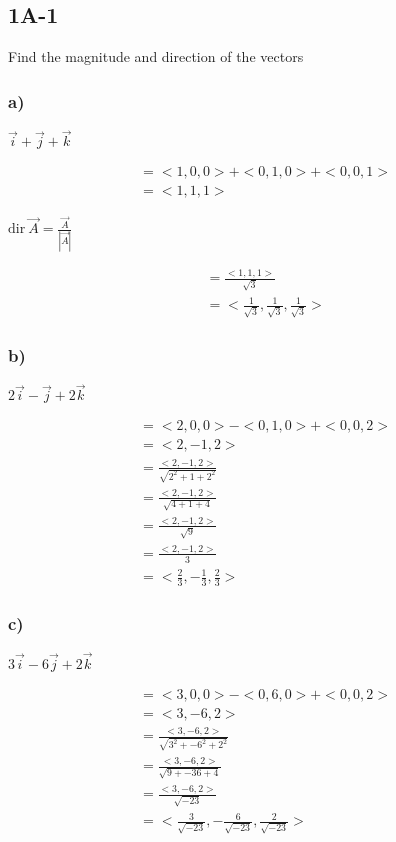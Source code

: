 \subsection*{1A-1}
Find the magnitude and direction of the vectors
    
\subsubsection*{a)} $\vec{i} + \vec{j} + \vec{k}$

        \begin{align*}
            &= <1, 0, 0> + <0,1,0> + <0,0,1>\\
            &= <1,1,1>
        \end{align*}

        $\text{dir} \ \vec{A} = \frac{\vec{A}}{|\vec{A}|}$

        \begin{align*}
            &= \frac{<1,1,1>}{\sqrt{3}}\\
            &= <\frac{1}{\sqrt{3}}, \frac{1}{\sqrt{3}},\frac{1}{\sqrt{3}}>
        \end{align*}

\subsubsection*{b)} $2\vec{i} - \vec{j} + 2\vec{k}$

    \begin{align*}
        &= <2, 0, 0> - <0,1,0> + <0,0,2>\\
        &= <2,-1,2>\\
        &= \frac{<2,-1,2>}{\sqrt{2^2 + 1 + 2^2}}\\
        &= \frac{<2,-1,2>}{\sqrt{4 + 1 + 4}}\\
        &= \frac{<2,-1,2>}{\sqrt{9}}\\
        &= \frac{<2,-1,2>}{3}\\
        &= <\frac{2}{3}, -\frac{1}{3},\frac{2}{3}>
    \end{align*}


\subsubsection*{c)}$3\vec{i} - 6\vec{j} + 2\vec{k}$

    \begin{align*}
        &= <3, 0, 0> - <0,6,0> + <0,0,2>\\
        &= <3,-6,2>\\
        &= \frac{<3,-6,2>}{\sqrt{3^2 + -6^2 + 2^2}}\\
        &= \frac{<3,-6,2>}{\sqrt{9 + -36 + 4}}\\
        &= \frac{<3,-6,2>}{\sqrt{-23}}\\
        &= <\frac{3}{\sqrt{-23}}, -\frac{6}{\sqrt{-23}},\frac{2}{\sqrt{-23}}>
    \end{align*}
    


